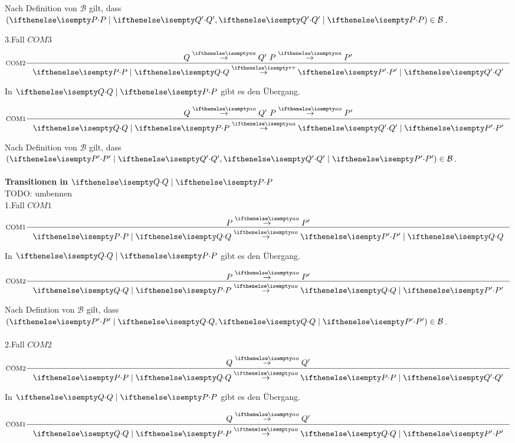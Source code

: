 \documentclass[a4paper,10pt]{article}
\begin{document}
Nach Definition von $\mathcal{B}$ gilt, 
dass $(\Par{P}{Q'},\Par{Q'}{P}) \in \mathcal{B}$.

3.Fall $COM3$ \\
\begin{displaymath}
    \inference[COM2]
    {
      Q \CCSTrans{a} Q' \, \, P \CCSTrans{a} P' 
    }
    {
        \Par{P}{Q} \CCSTrans{\tau} \Par{P'}{Q'}
    }
\end{displaymath}

In $\Par {Q}{P}$ gibt es den Übergang.

\begin{displaymath}
    \inference[COM1]
    {
      Q \CCSTrans{a} Q' \, \, P \CCSTrans{a} P' 
    }
    {
        \Par{Q}{P} \CCSTrans{a} \Par{Q'}{P'}
    }
\end{displaymath}

Nach Definition von $\mathcal{B}$ gilt, 
dass $(\Par{P'}{Q'},\Par{Q'}{P'}) \in \mathcal{B}$.\\\\

\textbf{Transitionen in $\Par {Q}{P}$}\\
TODO: umbennen\\

1.Fall $COM1$ \\
\begin{displaymath}
    \inference[COM1]
    {
      P \CCSTrans{a} P'
    }
    {
        \Par{P}{Q} \CCSTrans{a} \Par{P'}{Q}
    }
\end{displaymath}

In $\Par {Q}{P}$ gibt es den Übergang.

\begin{displaymath}
    \inference[COM2]
    {
      P \CCSTrans{a} P'
    }
    {
        \Par{Q}{P} \CCSTrans{a} \Par{Q}{P'}
    }
\end{displaymath}

Nach Defintion von $\mathcal{B}$ gilt, dass $(\Par{P'}{Q},\Par{Q}{P'}) \in \mathcal{B}$.\\
\\
2.Fall $COM2$ \\
\begin{displaymath}
    \inference[COM2]
    {
      Q \CCSTrans{a} Q'
    }
    {
        \Par{P}{Q} \CCSTrans{a} \Par{P}{Q'}
    }
\end{displaymath}

In $\Par {Q}{P}$ gibt es den Übergang.

\begin{displaymath}
    \inference[COM1]
    {
      Q \CCSTrans{a} Q'
    }
    {
        \Par{Q}{P} \CCSTrans{a} \Par{Q}{P'}
    }
\end{displaymath}
\end{document}
